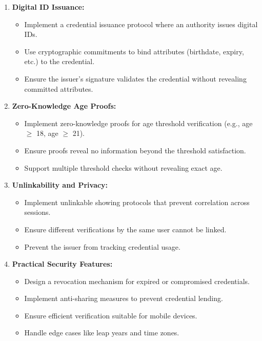 \documentclass[10pt,a4paper,american]{exam}
\begin{document}
\begin{enumerate}
	\item \textbf{Digital ID Issuance:}
	      \begin{itemize}
		      \item Implement a credential issuance protocol where an authority issues digital IDs.
		      \item Use cryptographic commitments to bind attributes (birthdate, expiry, etc.) to the credential.
		      \item Ensure the issuer's signature validates the credential without revealing committed attributes.
	      \end{itemize}

	\item \textbf{Zero-Knowledge Age Proofs:}
	      \begin{itemize}
		      \item Implement zero-knowledge proofs for age threshold verification (e.g., age $\geq$ 18, age $\geq$ 21).
		      \item Ensure proofs reveal no information beyond the threshold satisfaction.
		      \item Support multiple threshold checks without revealing exact age.
	      \end{itemize}

	\item \textbf{Unlinkability and Privacy:}
	      \begin{itemize}
		      \item Implement unlinkable showing protocols that prevent correlation across sessions.
		      \item Ensure different verifications by the same user cannot be linked.
		      \item Prevent the issuer from tracking credential usage.
	      \end{itemize}

	\item \textbf{Practical Security Features:}
	      \begin{itemize}
		      \item Design a revocation mechanism for expired or compromised credentials.
		      \item Implement anti-sharing measures to prevent credential lending.
		      \item Ensure efficient verification suitable for mobile devices.
		      \item Handle edge cases like leap years and time zones.
	      \end{itemize}
\end{enumerate}
\end{document}
